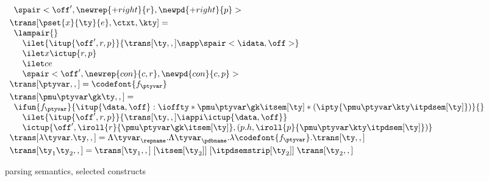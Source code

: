 \begin{figure}
\[\begin{array}{l}
\begin{array}{l}
{    \def \r {\newrep {+right}{r}}
    \def \p {\newpd {+right}{p}}
    \spair<\off',\r,\p>
  }\\ %
  \end{array}
\\[3pt]
  \trans[\pset{x}{\ty}{e},\ctxt,\kty] = \\
  \begin{array}{l}  
    \lampair{} \\
    \quad \ilet {\itup{\off',r,p}}{\trans[\ty,,] \sapp \spair<\idata,\off>} \\
    \quad \ilet x {\ictup{r,p}}\\
    \quad \ilet c e \\
    \quad \spair<\off',\newrep {con} {c,r},\newpd {con} {c,p}>
  \end{array}
\\[3pt]
\trans[\ptyvar,,] = \codefont{f_\ptyvar}
\\[3pt]
\trans[\pmu \ptyvar \gk \ty,,] = \\
  \begin{array}{l}
  \ifun {f_\ptyvar} {\itup{\data,\off} :
    \ioffty * \pmu \ptyvar \gk \itsem[\ty] 
                    * (\ipty{\pmu \ptyvar \kty \itpdsem[\ty]}) } {}\\
  \quad \ilet {\itup{\off',r,p}} 
   {\trans[\ty,,] \iappi \ictup{\data,\off}} \\ 
  \quad \ictup{\off',\iroll{r}{\pmu \ptyvar \gk \itsem[\ty]},
     (p.h,\iroll{p}{\pmu \ptyvar \kty \itpdsem[\ty]})}
  \end{array}  
\\[3pt]
\trans[\lambda\tyvar . \ty,,] = %
    \Lambda \tyvar_\repname. 
    \Lambda \tyvar_\pdbname. \lambda \codefont{f_\ptyvar}. \trans[\ty,,]
\\[3pt]
\trans[\ty_1 \ty_2,,] = 
    \trans[\ty_1,,]\; [\itsem[\ty_2]]\; [\itpdsemstrip[\ty_2]]\; \trans[\ty_2,,]
\\
\end{array}
\]
\caption{\ddc{} parsing semantics, selected constructs}
\label{fig:ddc-sem-sum}
\end{figure}


